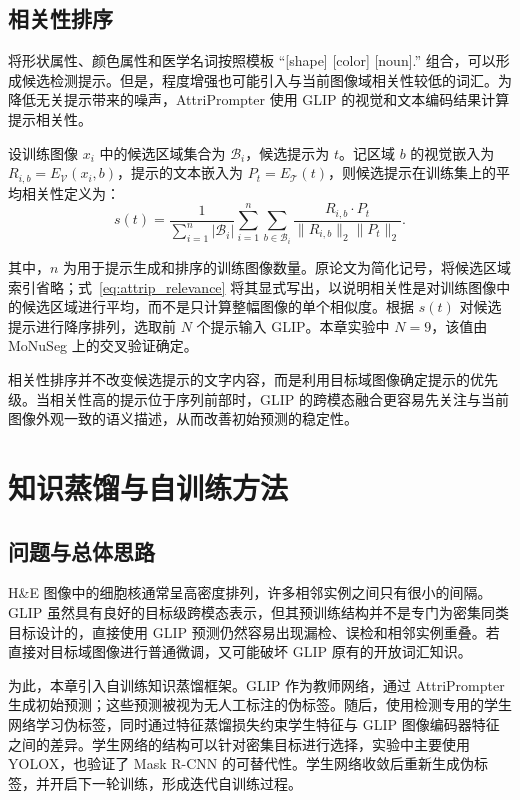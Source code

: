 \subsection{相关性排序}

将形状属性、颜色属性和医学名词按照模板 ``[shape] [color] [noun].'' 组合，可以形成候选检测提示。但是，程度增强也可能引入与当前图像域相关性较低的词汇。为降低无关提示带来的噪声，AttriPrompter 使用 GLIP 的视觉和文本编码结果计算提示相关性。

设训练图像 $x_i$ 中的候选区域集合为 $\mathcal{B}_i$，候选提示为 $t$。记区域 $b$ 的视觉嵌入为 $R_{i,b}=E_{\mathcal V}(x_i,b)$，提示的文本嵌入为 $P_t=E_{\mathcal T}(t)$，则候选提示在训练集上的平均相关性定义为：
\begin{equation}
\label{eq:attrip_relevance}
s(t)=\frac{1}{\sum_{i=1}^{n}|\mathcal{B}_i|}
\sum_{i=1}^{n}\sum_{b\in\mathcal{B}_i}
\frac{R_{i,b}\cdot P_t}{\|R_{i,b}\|_2\|P_t\|_2}.
\end{equation}

其中，$n$ 为用于提示生成和排序的训练图像数量。原论文为简化记号，将候选区域索引省略；式~\ref{eq:attrip_relevance} 将其显式写出，以说明相关性是对训练图像中的候选区域进行平均，而不是只计算整幅图像的单个相似度。根据 $s(t)$ 对候选提示进行降序排列，选取前 $N$ 个提示输入 GLIP。本章实验中 $N=9$，该值由 MoNuSeg 上的交叉验证确定。

相关性排序并不改变候选提示的文字内容，而是利用目标域图像确定提示的优先级。当相关性高的提示位于序列前部时，GLIP 的跨模态融合更容易先关注与当前图像外观一致的语义描述，从而改善初始预测的稳定性。

\section{知识蒸馏与自训练方法}

\subsection{问题与总体思路}

H\&E 图像中的细胞核通常呈高密度排列，许多相邻实例之间只有很小的间隔。GLIP 虽然具有良好的目标级跨模态表示，但其预训练结构并不是专门为密集同类目标设计的，直接使用 GLIP 预测仍然容易出现漏检、误检和相邻实例重叠。若直接对目标域图像进行普通微调，又可能破坏 GLIP 原有的开放词汇知识。

为此，本章引入自训练知识蒸馏框架。GLIP 作为教师网络，通过 AttriPrompter 生成初始预测；这些预测被视为无人工标注的伪标签。随后，使用检测专用的学生网络学习伪标签，同时通过特征蒸馏损失约束学生特征与 GLIP 图像编码器特征之间的差异。学生网络的结构可以针对密集目标进行选择，实验中主要使用 YOLOX，也验证了 Mask R-CNN 的可替代性。学生网络收敛后重新生成伪标签，并开启下一轮训练，形成迭代自训练过程。

